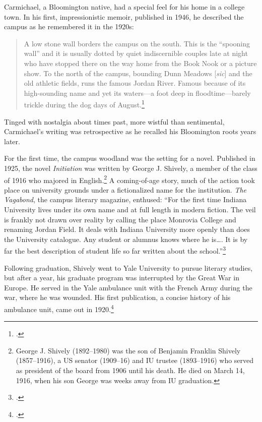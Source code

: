 \documentclass[
  american,
  letterpaper,
]{scrreprt}
\begin{document}
Carmichael, a Bloomington native, had a special feel for his home in a
college town. In his first, impressionistic memoir, published in 1946,
he described the campus as he remembered it in the 1920s:

\begin{quote}
A low stone wall borders the campus on the south. This is the ``spooning
wall'' and it is usually dotted by quiet indiscernible couples late at
night who have stopped there on the way home from the Book Nook or a
picture show. To the north of the campus, bounding Dunn Meadows
{[}\emph{sic}{]} and the old athletic fields, runs the famous Jordan
River. Famous because of its high-sounding name and yet its waters---a
foot deep in floodtime---barely trickle during the dog days of
August.\footnote{.}
\end{quote}

Tinged with nostalgia about times past, more wistful than sentimental,
Carmichael's writing was retrospective as he recalled his Bloomington
roots years later.

For the first time, the campus woodland was the setting for a novel.
Published in 1925, the novel \emph{Initiation} was written by George J.
Shively, a member of the class of 1916 who majored in
English.\footnote{George J. Shively (1892--1980) was the son of Benjamin
  Franklin Shively (1857--1916), a US senator (1909--16) and IU trustee
  (1893--1916) who served as president of the board from 1906 until his
  death. He died on March 14, 1916, when his son George was weeks away
  from IU graduation.} A coming-of-age story, much of the action took
place on university grounds under a fictionalized name for the
institution. \emph{The Vagabond}, the campus literary magazine,
enthused: ``For the first time Indiana University lives under its own
name and at full length in modern fiction. The veil is frankly not drawn
over reality by calling the place Monrovia College and renaming Jordan
Field. It deals with Indiana University more openly than does the
University catalogue. Any student or alumnus knows where he is\ldots. It
is by far the best description of student life so far written about the
school.''\footnote{.}

Following graduation, Shively went to Yale University to pursue literary
studies, but after a year, his graduate program was interrupted by the
Great War in Europe. He served in the Yale ambulance unit with the
French Army during the war, where he was wounded. His first publication,
a concise history of his ambulance unit, came out in 1920.\footnote{.}
\end{document}
